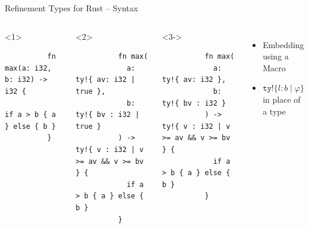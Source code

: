 \documentclass{sdqbeamer}
\newcommand{\code}[1]{\texttt{#1}}
\begin{document}
\begin{frame}[fragile]{Refinement Types for Rust -- Syntax}
  \begin{columns}
      \begin{onlyenv}<1>
        \begin{verbatim}
          fn max(a: i32, b: i32) -> i32 {
            if a > b { a } else { b }
          }
        \end{verbatim}
      \end{onlyenv}
      \begin{onlyenv}<2>
        \begin{verbatim}
          fn max(
            a: ty!{ av: i32 | true }, 
            b: ty!{ bv : i32 | true }
          ) -> ty!{ v : i32 | v >= av && v >= bv } {
            if a > b { a } else { b }
          }
        \end{verbatim}
      \end{onlyenv}
      \begin{onlyenv}<3->
        \begin{verbatim}
          fn max(
            a: ty!{ av: i32 }, 
            b: ty!{ bv : i32 }
          ) -> ty!{ v : i32 | v >= av && v >= bv } {
            if a > b { a } else { b }
          }
        \end{verbatim}
      \end{onlyenv}

    \begin{itemize}
      \item Embedding using a Macro
      \item $\code{ty!}\{ l : b \mid \varphi \}$ in place of a type
    \end{itemize}
  \end{columns}
\end{frame}
\end{document}
